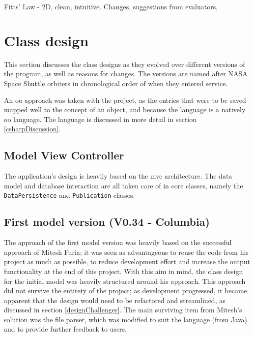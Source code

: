 Fitts' Law - 2D, clean, intuitive. Changes, suggestions from evaluators, 

\section{Class design}
This section discusses the class designs as they evolved over different versions of the program, as well as reasons for changes.  The versions are named after NASA Space Shuttle orbiters in chronological order of when they entered service.

An \gls{oo} approach was taken with the project, as the entries that were to be saved mapped well to the concept of an object, and because the \cs language is a natively \gls{oo} language.  The \cs language is discussed in more detail in section \ref{csharpDiscussion}.

\subsection{Model View Controller}
The application's design is heavily based on the \gls{mvc} architecture.  The data model and database interaction are all taken care of in core classes, namely the \texttt{DataPersistence} and \texttt{Publication} classes.

\subsection{First model version (V0.34 - Columbia)}
\label{columbia}
The approach of the first model version was heavily based on the successful approach of Mitesh Furia; it was seen as advantageous to reuse the code from his project as much as possible, to reduce development effort and increase the output functionality at the end of this project.  With this aim in mind, the class design for the initial model was heavily structured around his approach.  This approach did not survive the entirety of the project; as development progressed, it became apparent that the design would need to be refactored and streamlined, as discussed in section \ref{designChallenger}.  The main surviving item from Mitesh's solution was the file parser, which was modified to suit the \cs language (from Java) and to provide further feedback to users.


